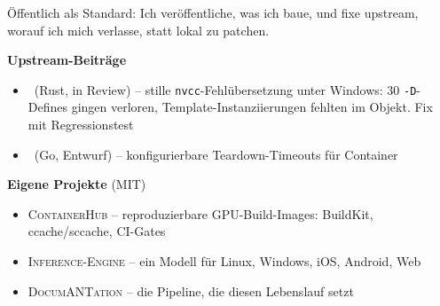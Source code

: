 {    
    \par\noindent
    {\small Öffentlich als Standard: Ich veröffentliche, was ich baue, und fixe
    upstream, worauf ich mich verlasse, statt lokal zu patchen.}
    \vspace{0.4em}
    \par\noindent
    \twocolumnsection
    {\small\textbf{Upstream-Beiträge}
    \begin{itemize}[leftmargin=*,nosep]
        \item {}\ (Rust, in Review) -- stille \texttt{nvcc}-Fehlübersetzung unter Windows: 30 \texttt{-D}-Defines gingen verloren, Template-Instanziierungen fehlten im Objekt. Fix mit Regressionstest
        \item {}\ (Go, Entwurf) -- konfigurierbare Teardown-Timeouts für Container
    \end{itemize}}
    {\small\textbf{Eigene Projekte} (MIT)
    \begin{itemize}[leftmargin=*,nosep]
        \item \textsc{ContainerHub} -- reproduzierbare GPU-Build-Images: BuildKit, ccache/sccache, CI-Gates
        \item \textsc{Inference-Engine} -- ein Modell für Linux, Windows, iOS, Android, Web
        \item \textsc{DocumANTation} -- die Pipeline, die diesen Lebenslauf setzt
    \end{itemize}}
}
